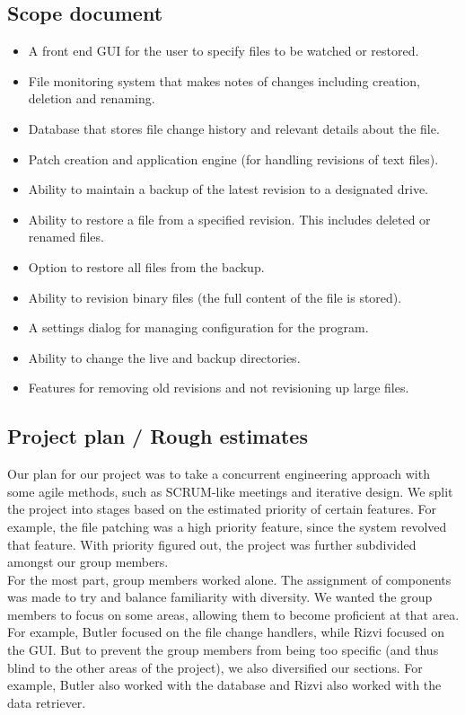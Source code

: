 \documentclass[12pt,a4paper]{article}
\begin{document}
\subsection{Scope document}
\begin{itemize}
\item A front end GUI for the user to specify files to be watched or restored.
\item File monitoring system that makes notes of changes including creation, deletion and renaming.
\item Database that stores file change history and relevant details about the file.
\item Patch creation and application engine (for handling revisions of text files).
\item Ability to maintain a backup of the latest revision to a designated drive.
\item Ability to restore a file from a specified revision. This includes deleted or renamed files.
\item Option to restore all files from the backup.
\item Ability to revision binary files (the full content of the file is stored).
\item A settings dialog for managing configuration for the program.
\item Ability to change the live and backup directories.
\item Features for removing old revisions and not revisioning up large files.
\end{itemize}

\subsection{Project plan / Rough estimates}
Our plan for our project was to take a concurrent engineering approach with some agile methods, such as SCRUM-like meetings and iterative design. We split the project into stages based on the estimated priority of certain features. For example, the file patching was a high priority feature, since the system revolved that feature. With priority figured out, the project was further subdivided amongst our group members. \\

For the most part, group members worked alone. The assignment of components was made to try and balance familiarity with diversity. We wanted the group members to focus on some areas, allowing them to become proficient at that area. For example, Butler focused on the file change handlers, while Rizvi focused on the GUI. But to prevent the group members from being too specific (and thus blind to the other areas of the project), we also diversified our sections. For example, Butler also worked with the database and Rizvi also worked with the data retriever. \\
\end{document}
